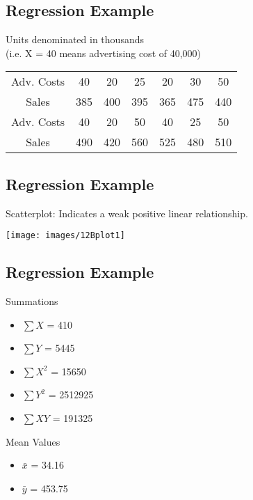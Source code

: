 	
	\subsection{Regression Example}
	Units denominated in thousands \\(i.e. X = 40 means advertising cost of 40,000)
	\begin{center}
		\begin{tabular}{|c|c|c|c|c|c|c|}
			\hline
			Adv. Costs & 40 & 20 & 25 & 20 & 30 & 50\\
			Sales & 385& 400& 395& 365& 475& 440\\ \hline \hline
			Adv. Costs & 40 & 20 & 50 & 40 & 25 & 50\\
			Sales & 490& 420& 560& 525& 480& 510\\
			\hline
		\end{tabular}
	\end{center}
	
	
	
	\subsection{Regression Example}
	Scatterplot: Indicates a weak positive linear relationship.
	\begin{center}
		\texttt{[image: images/12Bplot1]}
	\end{center}
	
	\subsection{Regression Example}
	Summations
\begin{multicols}{3}
	\begin{itemize}
		\item $\sum X$ = 410
		\item $\sum Y$ = 5445
		\item $\sum X^2$ = 15650
		\item $\sum Y^2$ = 2512925
		\item $\sum XY$ = 191325
	\end{itemize}
\end{multicols}
	Mean Values
	\begin{itemize}
		\item $\bar{x}$ = 34.16
		\item $\bar{y}$ = 453.75
	\end{itemize}
	
